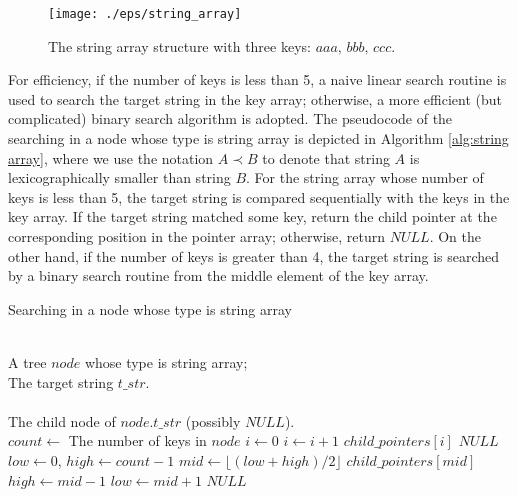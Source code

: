 \documentclass{article}
\begin{document}
\begin{figure}[htbp]
  \centering
  \texttt{[image: ./eps/string\_array]}
  \caption{The string array structure with three keys: $aaa,\, bbb,\,
    ccc$.}
  \label{fig:string array}
\end{figure}

For efficiency, if the number of keys is less than 5, a naive linear
search routine is used to search the target string in the key array;
otherwise, a more efficient (but complicated) binary search algorithm
is adopted.  The pseudocode of the searching in a node whose type is
string array is depicted in Algorithm \ref{alg:string array}, where we
use the notation $A \prec B$ to denote that string $A$ is
\textsf{lexicographically smaller} than string $B$. For the string
array whose number of keys is less than 5, the target string is
compared sequentially with the keys in the key array. If the target
string matched some key, return the child pointer at the corresponding
position in the pointer array; otherwise, return $NULL$. On the other
hand, if the number of keys is greater than 4, the target string is
searched by a binary search routine from the middle element of the key
array.

\begin{algorithm}
  \caption{Searching in a node whose type is string array}\scriptsize
  \label{alg:string array}
  \begin{algorithmic}[1]
    \REQUIRE ~~\\
    A tree $node$ whose type is string array; \\
    The target string $t\_str$.\\
    \ENSURE ~~\\
    The child node of $node.t\_str$ (possibly $NULL$).\\
    \STATE
    \STATE $count \leftarrow$ The number of keys in $node$
    \STATE
    \STATE $i \leftarrow 0$
    \STATE $i \leftarrow i+1$
    \ENDWHILE
    \RETURN $child\_pointers[i]$
    \ELSE
    \RETURN $NULL$
    \ENDIF
    \ELSE
    \STATE $low \leftarrow 0$, $high \leftarrow count-1$
    \STATE $mid \leftarrow \lfloor (low+high)/2 \rfloor$
    \RETURN $child\_pointers[mid]$
    \STATE $high \leftarrow mid - 1$
    \ELSE
    \STATE $low \leftarrow mid + 1$
    \ENDIF
    \ENDWHILE
    \RETURN $NULL$
    \ENDIF
  \end{algorithmic}
\end{algorithm}
\end{document}
